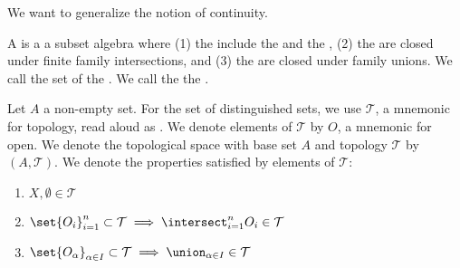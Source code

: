 
\sbasic



\sstart



We want to generalize the notion of
continuity.


A  is a
a subset algebra where
(1) the
include the 
and the ,
(2) the
are closed under finite family intersections, and
(3) the
are closed under family unions.
We call the set of
the .
We call the
the .

Let $A$ a non-empty set.
For the set of distinguished sets, we use $\mathcal{T}$,
a mnemonic for topology, read aloud as .
We denote elements of $\mathcal{T}$ by $O$, a mnemonic
for open.
We denote the topological space with base set $A$ and
topology $\mathcal{T}$ by $(A, \mathcal{T})$.
We denote the properties satisfied by elements of
$\mathcal{T}$:
\begin{enumerate}

  \item
  $X,\emptyset \in \mathcal{T}$

  \item
  $\set{O_i}_{i = 1}^{n} \subset \mathcal{T}
  \implies
  \intersect_{i = 1}^{n} O_i \in \mathcal{T}$

  \item
  $\set{O_\alpha}_{\alpha \in I} \subset \mathcal{T}
  \implies
  \union_{\alpha \in I} \in \mathcal{T}$


\end{enumerate}

\strats
